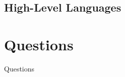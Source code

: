 \documentclass[serif,mathserif,compress]{beamer}
\begin{document}
\subsection{High-Level Languages}


%
%
%

\section{Questions}

\begin{frame}{Questions}
\end{frame}
\end{document}
